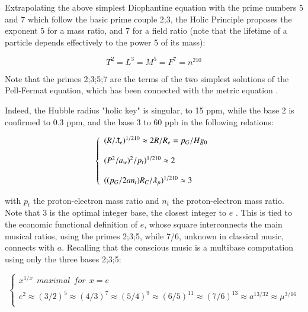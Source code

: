 \documentclass[a4paper,9pt]{article}
\begin{document}


Extrapolating the above simplest Diophantine equation with the prime numbers 5 and 7 which follow the basic prime couple 2;3, the Holic Principle proposes the exponent 5 for a mass ratio, and 7 for a field ratio (note that the lifetime of a particle depends effectively to the power 5 of its mass):

\begin{equation}\label{Eq13}
T^2 = L^3 = M^5 = F^7 = n^{210}
 \end{equation}
 
 Note that the primes 2;3;5;7 are the terms of the two simplest solutions of the Pell-Fermat equation, which has been connected with the metric equation \cite{Sanchez1}. 
 
 Indeed, the Hubble radius "holic key" is singular, to 15 ppm, while the base 2 is confirmed to 0.3 ppm, and the base 3 to 60 ppb in the following relations:
 
 
 \begin{equation}\label{Eq14}
 \left\{
    \begin{array}{ll}
        (R/\lambdabar_e)^{1/210} \approx 2R/R_e = p_G/Hg_0 \\
    \\
        (P^2/a_w)^2/p_t)^{1/210}\approx 2\\
      \\  
        ((p_G/2an_t) R_C/\lambdabar_p)^{1/210} \approx 3
    \end{array}
\right.
\end{equation}




with $p_t$ the proton-electron mass ratio and $n_t$ the proton-electron mass ratio. Note that 3 is the optimal integer base, the closest integer to $e$ \cite{Hayes}. This is tied to the economic functional definition of $e$, whose square interconnects the main musical ratios, using the primes 2;3;5, while 7/6, unknown in classical music, connects with $a$. Recalling that the conscious music is a multibase computation using only the three bases 2;3;5: 

\begin{equation}\label{Eq14}
 \left\{
    \begin{array}{ll}
       x^{1/x} ~~maximal~~ for~~ x = e\\
       \\
        e^2\approx (3/2)^5 \approx (4/3)^7\approx (5/4)^9\approx (6/5)^{11}\approx (7/6)^{13} \approx a^{13/32} \approx \mu^{3/16}\\

    \end{array}
\right.
\end{equation}
\end{document}
